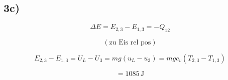 

\subsection*{3c)}

\[
\Delta E = E_{2,3} - E_{1,3} = -Q_{12}
\]

\[
\left( \text{zu Eis rel pos} \right)
\]

\[
E_{2,3} - E_{1,3} = U_L - U_3 = m g (u_L - u_3) = m g c_v (T_{2,3} - T_{1,3})
\]

\[
= 1085 \, \text{J}
\]


